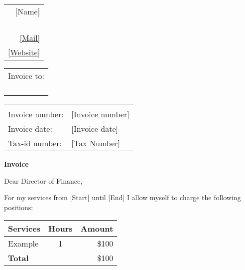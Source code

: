 \documentclass[fontsize=11pt,parskip=half]{scrartcl}
\newcommand*{\amount}[1]{{\$}#1}
\newcommand*{\MyCompanyName}{[Name]\xspace}
\newcommand*{\MyCompanyStreet}{[Adress 1]\xspace}
\newcommand*{\MyCompanyCity}{[Adress 2]\xspace}
\newcommand*{\MyCompanyCountry}{[Adress 3]\xspace}
\newcommand*{\MyCompanyUstIdNumber}{[Tax Number]\xspace}
\newcommand*{\MyMobilePhone}{[Phone]\xspace}
\newcommand*{\MyEmail}{[Mail]}
\newcommand*{\MyURL}{[Website]}
\newcommand*{\TheirCompanyName}{[Company]\xspace}
\newcommand*{\TheirCompanyStreet}{[Company adress 1]\xspace}
\newcommand*{\TheirCompanyCity}{[Company adress 2]\xspace}
\newcommand*{\TheirCompanyCountry}{[Company adress 3]\xspace}
\newcommand*{\InvoiceNumber}{[Invoice number]\xspace}
\newcommand*{\InvoiceDate}{[Invoice date]\xspace}
\newcommand*{\FromDate}{[Start]\xspace}
\newcommand*{\UntilDate}{[End]\xspace}
\newcommand*{\VSpace}{1em}
\newcommand*{\Vspace}{0.25em}
\begin{document}
	\DateFormat
	\sffamily

	\begin{minipage}[t]{\textwidth}
		\raggedleft
		\begin{tabular}{@{}r@{}}
			\MyCompanyName\\
			\MyCompanyStreet\\
			\MyCompanyCity\\
			\MyCompanyCountry\\
			\MyMobilePhone\\
			\href{mailto:\MyEmail}{\MyEmail}\\
			\href{\MyURL}{\MyURL}
		\end{tabular}
	\end{minipage}
	\vspace{\VSpace}

	\begin{minipage}[t]{.5\textwidth}
		\vspace{0pt}
  		\begin{tabular}{@{}l@{}}
   			Invoice to:\\
    			\TheirCompanyName\\
    			\TheirCompanyStreet\\
    			\TheirCompanyCity\\
    			\TheirCompanyCountry\\
  		\end{tabular}
	\end{minipage}
	\begin{minipage}[t]{0.5\textwidth}
  		\vspace{0pt}
  		\raggedleft
  		\begin{tabular}{@{}ll}
    			&\\
    			Invoice number: & \InvoiceNumber\\
    			Invoice date:   & \InvoiceDate\\
    			Tax-id number:  & \MyCompanyUstIdNumber\\
  		\end{tabular}
	\end{minipage}
	\vspace{\VSpace}

	\textbf{Invoice}
	\vspace{\VSpace}

	Dear Director of Finance,

	For my services from \FromDate until \UntilDate I allow myself to charge the following positions:

	\def\arraystretch{1.5}
	\begin{tabularx}{\textwidth}{@{}L{0.8}C{0.1}R{0.1}}
  		\textbf{Services} & Hours & Amount\\
  		\hline
  		Example & 1 & \amount{100}\\
  		\hline
  		\textbf{Total} && \amount{100}\\
	\end{tabularx}
	\vspace{\Vspace}
\end{document}
